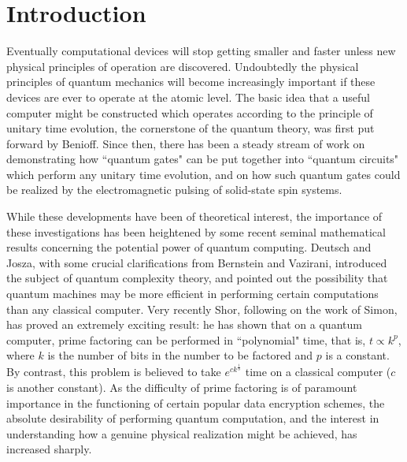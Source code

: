 \section{Introduction}
\label{sec:level0}

Eventually computational devices will stop getting smaller
and faster unless new
physical principles of operation are discovered.  Undoubtedly the physical
principles
of quantum mechanics will become increasingly important if
these devices are ever to operate at the atomic level.
The basic idea that a useful computer might be constructed which operates
according to the principle of unitary time evolution, the cornerstone
of the quantum theory, was first put forward by Benioff\cite{Beni}.
Since then,
there has been a steady stream of work on demonstrating how ``quantum
gates" can be put together into ``quantum circuits" which perform any
unitary time evolution, and on how such quantum gates could be realized
by the electromagnetic pulsing of solid-state spin systems.

While these developments have been of theoretical interest, the importance
of these investigations has been heightened by some recent seminal
mathematical results concerning the potential power of quantum computing.
Deutsch and Josza\cite{Deu92}, with some crucial clarifications from
Bernstein and Vazirani\cite{BV},
introduced the subject of quantum complexity theory,
and pointed out the possibility that quantum machines may be more
efficient in performing certain computations than any classical computer.
Very recently Shor\cite{Shor},
following on the work of Simon\cite{Simon}, has proved an extremely
exciting result: he has shown that on a quantum computer, prime factoring
can be performed in ``polynomial" time, that is, $t\propto k^p$, where
$k$ is the number of
bits in the number to be factored and $p$ is a constant.
By contrast, this problem is believed to take
$e^{ck^{\frac{1}{3}}}$ time on a classical computer
($c$ is another constant).
As the difficulty of prime factoring
is of paramount importance in  the functioning of certain popular data
encryption schemes, the absolute desirability of performing quantum
computation, and the interest in understanding how a genuine physical
realization might be achieved, has increased sharply.

